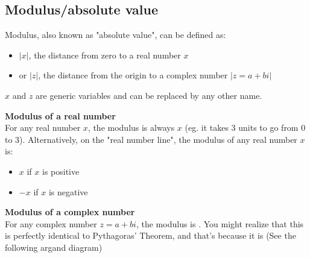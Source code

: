 \documentclass{article}
\begin{document}
\begin{center}
\end{center}

\subsection{Modulus/absolute value}
Modulus, also known as "absolute value", can be defined as:
\begin{itemize}
    \item $|x|$, the distance from zero to a real number $x$
    \item or $|z|$, the distance from the origin to a complex number $|z=a+bi|$
\end{itemize}

\noindent$x$ and $z$ are generic variables and can be replaced by any other name.

\vspace{\baselineskip}

\noindent\textbf{Modulus of a real number} \\
For any real number $x$, the modulus is always $x$ (eg. it takes 3 units to go from 0 to 3). Alternatively, on the "real number line", the modulus of any real number $x$ is:
\begin{itemize}
    \item $x$ if $x$ is positive
    \item $-x$ if $x$ is negative
\end{itemize}

\noindent\textbf{Modulus of a complex number} \\
For any complex number $z=a+bi$, the modulus is . You might realize that this is perfectly identical to Pythagoras' Theorem, and that's because it is (See the following argand diagram)
\end{document}
